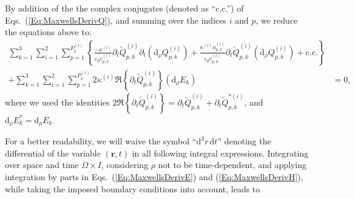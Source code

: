 \documentclass[aps,prl,notitlepage, superscriptaddress,longbibliography]{revtex4-1}
\begin{document}
By addition of the the complex conjugates (denoted as ``c.c.'') of Eqs.~(\ref{Eq:MaxwellsDerivQ}), and summing over the indices $i$ and $p$, we reduce the equations above to:
\begin{equation}\label{Eq:Qsum}
\begin{split}
\sum_{k=1}^{3}\sum_{i=1}^{2}\sum_{p=1}^{P_{k}^{(i)}}\left\{\frac{-\kappa^{(i)}}{\varepsilon_{0} c_{p, k}^{(i)}}\partial_{t}\tilde{Q}_{p, k}^{(i)}\partial_{t}(\mathrm{d}_{\rho}Q_{p, k}^{(i)})
+\frac{\kappa^{(i)} a_{p, k}^{(i)}}{\varepsilon_{0} c_{p, k}^{(i)}}\partial_{t}\tilde{Q}_{p, k}^{(i)} (\mathrm{d}_{\rho}Q_{p, k}^{(i)})+\mathrm{c.c.}\right\} \\
+\sum_{k=1}^{3}\sum_{i=1}^{2}\sum_{p=1}^{P_{k}^{(i)}}2\kappa^{(i)}\Re\left\{\partial_{t}\tilde{Q}_{p, k}^{(i)}\right\} (\mathrm{d}_{\rho}E_{k})  &= 0,
\end{split}
\end{equation}
where we used the identities $2\Re\left\{\partial_{t}\tilde{Q}_{p, k}^{(i)}\right\} = \partial_{t}\tilde{Q}_{p, k}^{(i)} + \partial_{t}\tilde{Q}_{p, k}^{*(i)}$, and $\mathrm{d}_{\rho}E^{*}_{k} = \mathrm{d}_{\rho}E_{k}$.\par 
For a better readability, we will waive the symbol ``$\mathrm{d}^3r\,\mathrm{d}t$'' denoting the differential of the variable $(\mathbf{r}, t)$ in all following integral expressions. Integrating over space and time $\Omega \times I$, considering $\rho$ not to be time-dependent, and applying integration by parts in Eqs.~(\ref{Eq:MaxwellsDerivE}) and (\ref{Eq:MaxwellsDerivH}), while taking the imposed boundary conditions into account, leads to
\end{document}
